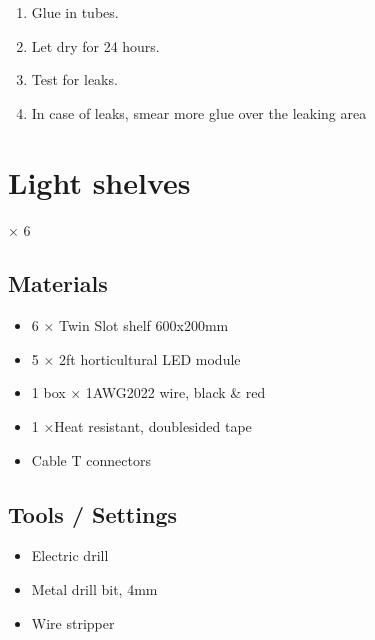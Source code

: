 \documentclass[letterpaper,10pt,english]{sphinxmanual}
\begin{document}
\noindent{}
\begin{enumerate}
%
\setcounter{enumi}{8}
\item {} 
Glue in tubes.

\item {} 
Let dry for 24 hours.

\item {} 
Test for leaks.

\item {} 
In case of leaks, smear more glue over the leaking area

\end{enumerate}


\section{Light shelves}
\label{\detokenize{light_shelves:light-shelves}}\label{\detokenize{light_shelves::doc}}
× 6

\noindent{}


\subsection{Materials}
\label{\detokenize{light_shelves:materials}}\begin{itemize}
\item {} 
6 × Twin Slot shelf 600x200mm

\item {} 
5 × 2ft horticultural LED module

\item {} 
1 box × 1AWG20\sphinxhyphen{}22 wire, black \& red

\item {} 
1 ×Heat resistant, double\sphinxhyphen{}sided tape

\item {} 
Cable T connectors

\end{itemize}


\subsection{Tools / Settings}
\label{\detokenize{light_shelves:tools-settings}}\begin{itemize}
\item {} 
Electric drill

\item {} 
Metal drill bit, 4mm

\item {} 
Wire stripper

\end{itemize}
\end{document}

